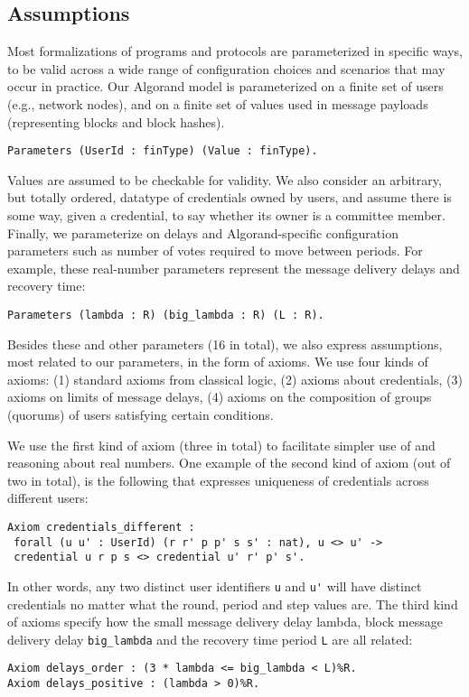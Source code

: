 \subsection{Assumptions}

Most formalizations of programs and protocols are parameterized in specific ways, to be valid across a wide range of configuration choices and scenarios that may occur in practice. Our Algorand model is parameterized on a finite set of users (e.g., network nodes), and on a finite set of values used in message payloads (representing blocks and block hashes). 

\begin{lstlisting}[language=Coq]
Parameters (UserId : finType) (Value : finType).
\end{lstlisting}

Values are assumed to be checkable for validity. We also consider an arbitrary, but totally ordered, datatype of credentials owned by users, and assume there is some way, given a credential, to say whether its owner is a committee member. Finally, we parameterize on delays and Algorand-specific configuration parameters such as number of votes required to move between periods. For example, these real-number parameters represent the message delivery delays and recovery time:

\begin{lstlisting}[language=Coq]
Parameters (lambda : R) (big_lambda : R) (L : R).
\end{lstlisting}

Besides these and other parameters (16 in total), we also express assumptions, most related to our parameters, in the form of axioms. We use four kinds of axioms:
(1) standard axioms from classical logic, (2) axioms about credentials, (3) axioms on limits of message delays, (4) axioms on the composition of groups (quorums) of users satisfying certain conditions.

We use the first kind of axiom (three in total) to facilitate simpler use of and reasoning about real numbers.
One example of the second kind of axiom (out of two in total), is the following that expresses uniqueness of credentials
across different users:
\begin{lstlisting}[language=Coq]
Axiom credentials_different :
 forall (u u' : UserId) (r r' p p' s s' : nat), u <> u' ->
 credential u r p s <> credential u' r' p' s'.
\end{lstlisting}
In other words, any two distinct user identifiers \lstinline{u} and \lstinline{u'} will have distinct credentials no matter what the round, period and step values are.
The third kind of axioms specify how the small message delivery delay lambda, block message delivery delay \lstinline{big_lambda} and the recovery time period \lstinline{L} are all related:
\begin{lstlisting}[language=Coq]
Axiom delays_order : (3 * lambda <= big_lambda < L)%R.
Axiom delays_positive : (lambda > 0)%R.
\end{lstlisting}

